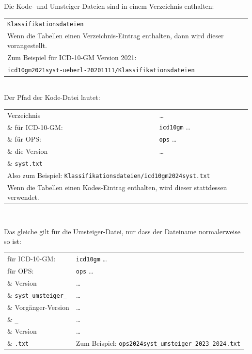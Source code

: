 Die Kode- und Umsteiger-Dateien sind in einem Verzeichnis enthalten:

\begingroup
\renewcommand{\arraystretch}{1.0}
\begin{tabular}{l}
\texttt{Klassifikationsdateien} \\
Wenn die Tabellen einen Verzeichnis-Eintrag enthalten, dann wird dieser vorangestellt. \\
Zum Beispiel für ICD-10-GM Version 2021: \\
\texttt{icd10gm2021syst-ueberl-20201111/Klassifikationsdateien} \\
\end{tabular}
\endgroup \\

Der Pfad der Kode-Datei lautet:

\begingroup
\renewcommand{\arraystretch}{1.0}
\begin{tabular}{p{4cm}l}
Verzeichnis & \ldots \\
\& für ICD-10-GM: & \texttt{icd10gm} \ldots \\
\& für OPS: & \texttt{ops} \ldots \\
\& die Version & \ldots\\
\& \texttt{syst.txt} \\
\multicolumn{2}{l}{Also zum Beispiel: \texttt{Klassifikationsdateien/icd10gm2024syst.txt}} \\
\multicolumn{2}{l}{Wenn die Tabellen einen Kodes-Eintrag enthalten, wird dieser stattdessen verwendet.} \\
\end{tabular}
\endgroup \\

\newpage %

Das gleiche gilt für die Umsteiger-Datei, nur dass der Dateiname normalerweise so ist:

\begingroup
\renewcommand{\arraystretch}{1.0}
\begin{tabular}{p{4cm}l}
für ICD-10-GM: & \texttt{icd10gm} \ldots\\
für OPS: & \texttt{ops} \ldots\\
\& Version & \ldots\\
\& \texttt{syst\_umsteiger\_} & \ldots\\
\& Vorgänger-Version & \ldots\\
\& \texttt{\_} & \ldots\\
\& Version & \ldots\\
\& \texttt{.txt} & Zum Beispiel: \texttt{ops2024syst\_umsteiger\_2023\_2024.txt}\\
\end{tabular}
\endgroup \\

